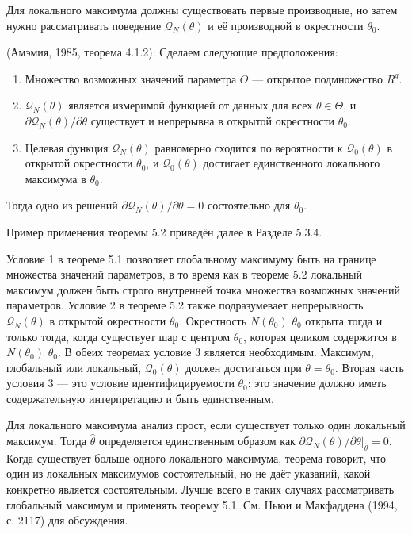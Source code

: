 Для локального максимума должны существовать первые производные, но затем нужно рассматривать поведение $\mathcal{Q}_N(\theta)$ и её производной в окрестности $\theta_0$.

\begin{theorem} (Амэмия, 1985, теорема 4.1.2): 
Сделаем следующие предположения:
\begin{enumerate}
\item Множество возможных значений параметра $\Theta$ --- открытое подмножество $R^q$.
\item $\mathcal{Q}_N(\theta)$ является измеримой функцией от данных для всех $\theta \in \Theta$, и  $\partial \mathcal{Q}_N(\theta) / \partial \theta $ существует и непрерывна в открытой окрестности $\theta_0$.
\item  Целевая функция $\mathcal{Q}_N(\theta)$ равномерно сходится по вероятности к $\mathcal{Q}_0(\theta)$ в открытой окрестности $\theta_0$, и  $\mathcal{Q}_0(\theta)$  достигает единственного локального максимума в $\theta_0$.
\end{enumerate}

Тогда одно из решений $\partial \mathcal{Q}_N(\theta) / \partial \theta =0 $ состоятельно для $\theta_0$. 
\end{theorem}

Пример применения теоремы 5.2 приведён далее в Разделе 5.3.4.

Условие 1 в теореме 5.1 позволяет глобальному максимуму быть на границе множества значений параметров, в то время как в теореме 5.2 локальный максимум должен быть строго внутренней точка множества возможных значений параметров. Условие 2 в теореме 5.2 также подразумевает непрерывность $\mathcal{Q}_N(\theta)$ в открытой окрестности $\theta_0$. Окрестность $N(\theta_0)$ $\theta_0$ открыта тогда и только тогда, когда существует шар с центром $\theta_0$, которая целиком содержится в $N(\theta_0)$ $\theta_0$. В обеих теоремах условие 3 является необходимым. Максимум, глобальный или локальный,  $\mathcal{Q}_0(\theta)$ должен достигаться при $\theta=\theta_0$. Вторая часть условия 3 --- это условие идентифицируемости $\theta_0$: это значение должно иметь  содержательную интерпретацию и быть единственным.

Для локального максимума анализ прост, если существует только один локальный максимум. Тогда 
$\hat{\theta}$ определяется единственным образом как $\partial \mathcal{Q}_N(\theta) / \partial \theta|_{\hat{\theta}}=0$. Когда существует больше одного локального максимума, теорема говорит, что один из локальных максимумов состоятельный, но не даёт указаний, какой конкретно является состоятельным. Лучше всего в таких случаях рассматривать глобальный максимум и применять теорему 5.1. См. Ньюи и Макфаддена (1994, с. 2117) для обсуждения.

